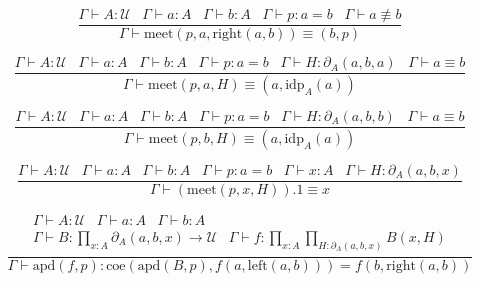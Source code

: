 \documentclass[a4paper,UKenglish,cleveref, autoref, thm-restate]{lipics-v2021}
\newcommand{\UU}{\ensuremath{\mathcal{U}}}
\begin{document}
\begin{equation*}
    \frac{\Gamma \vdash A : \UU \hspace{10pt} \Gamma \vdash a : A \hspace{10pt} \Gamma \vdash b : A \hspace{10pt} \Gamma \vdash p : a = b \hspace{10pt} \Gamma \vdash a \not\equiv b}
         {\Gamma \vdash \mathrm{meet}(p, a, \mathrm{right}(a, b)) \equiv (b, p)}
\end{equation*}

\begin{equation*}
    \frac{\Gamma \vdash A : \UU \hspace{10pt} \Gamma \vdash a : A \hspace{10pt} \Gamma \vdash b : A \hspace{10pt} \Gamma \vdash p : a = b \hspace{10pt} \Gamma \vdash H : \partial_A(a, b, a) \hspace{10pt} \Gamma \vdash a \equiv b}
         {\Gamma \vdash \mathrm{meet}(p, a, H) \equiv (a, \mathrm{idp}_A(a))}
\end{equation*}

\begin{equation*}
    \frac{\Gamma \vdash A : \UU \hspace{10pt} \Gamma \vdash a : A \hspace{10pt} \Gamma \vdash b : A \hspace{10pt} \Gamma \vdash p : a = b \hspace{10pt} \Gamma \vdash H : \partial_A(a, b, b) \hspace{10pt} \Gamma \vdash a \equiv b}
         {\Gamma \vdash \mathrm{meet}(p, b, H) \equiv (a, \mathrm{idp}_A(a))}
\end{equation*}

\begin{equation*}
    \frac{\Gamma \vdash A : \UU \hspace{10pt} \Gamma \vdash a : A \hspace{10pt} \Gamma \vdash b : A \hspace{10pt} \Gamma \vdash p : a = b \hspace{10pt} \Gamma \vdash x : A \hspace{10pt} \Gamma \vdash H : \partial_A(a, b, x)}
         {\Gamma \vdash (\mathrm{meet}(p, x, H)).1 \equiv x}
\end{equation*}

\begin{equation*}
    \frac{\begin{matrix}
            \Gamma \vdash A : \UU \hspace{10pt} \Gamma \vdash a : A \hspace{10pt} \Gamma \vdash b : A \\
            \Gamma \vdash B : \prod_{x : A} \partial_A(a, b, x) \rightarrow \UU \hspace{10pt} \Gamma \vdash f : \prod_{x : A} \prod_{H : \partial_A(a, b, x)} B(x, H)
          \end{matrix}}
         {\Gamma \vdash \mathrm{apd}(f, p) : \mathrm{coe}(\mathrm{apd}(B, p), f(a, \mathrm{left}(a, b))) = f(b, \mathrm{right}(a, b))}
\end{equation*}
\end{document}
